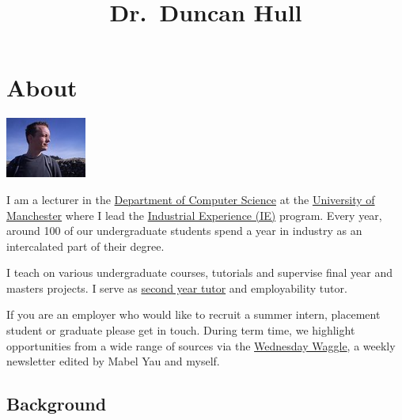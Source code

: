 \documentclass[12pt,]{book}
\title{Dr.~Duncan Hull}
\author{}
\date{}
\begin{document}
\maketitle

{
\setcounter{tocdepth}{1}
\tableofcontents
}
\hypertarget{about}{%
\chapter*{About}\label{about}}

\begin{center}\includegraphics[width=0.25\linewidth]{images/me-blue} \end{center}

I am a lecturer in the \href{https://www.cs.manchester.ac.uk/}{Department of Computer Science} at the \href{https://www.manchester.ac.uk}{University of Manchester} where I lead the \href{https://www.cs.manchester.ac.uk/study/undergraduate/industrial-experience/}{Industrial Experience (IE)} program. Every year, around 100 of our undergraduate students spend a year in industry as an intercalated part of their degree.

I teach on various undergraduate courses, tutorials and supervise final year and masters projects. I serve as \href{http://studentnet.cs.manchester.ac.uk/ugt/year2/}{second year tutor} and employability tutor.

If you are an employer who would like to recruit a summer intern, placement student or graduate please get in touch. During term time, we highlight opportunities from a wide range of sources via the \href{https://waggle.cs.manchester.ac.uk/waggle/about}{Wednesday Waggle}, a weekly newsletter edited by Mabel Yau and myself.

\hypertarget{background}{%
\section*{Background}\label{background}}
\end{document}
